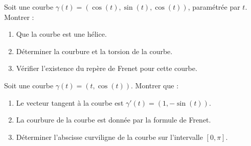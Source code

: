 \begin{exercice}
Soit une courbe \( \gamma(t) = (\cos(t), \sin(t), \cos(t)) \), paramétrée par \( t \). Montrer :
\begin{enumerate}
    \item Que la courbe est une hélice.
    \item Déterminer la courbure et la torsion de la courbe.
    \item Vérifier l'existence du repère de Frenet pour cette courbe.
\end{enumerate}
\end{exercice}

\begin{exercice}
Soit une courbe \( \gamma(t) = (t, \cos(t)) \). Montrer que :
\begin{enumerate}
    \item Le vecteur tangent à la courbe est \( \gamma'(t) = (1, -\sin(t)) \).
    \item La courbure de la courbe est donnée par la formule de Frenet.
    \item Déterminer l'abscisse curviligne de la courbe sur l'intervalle \( [0, \pi] \).
\end{enumerate}
\end{exercice}

